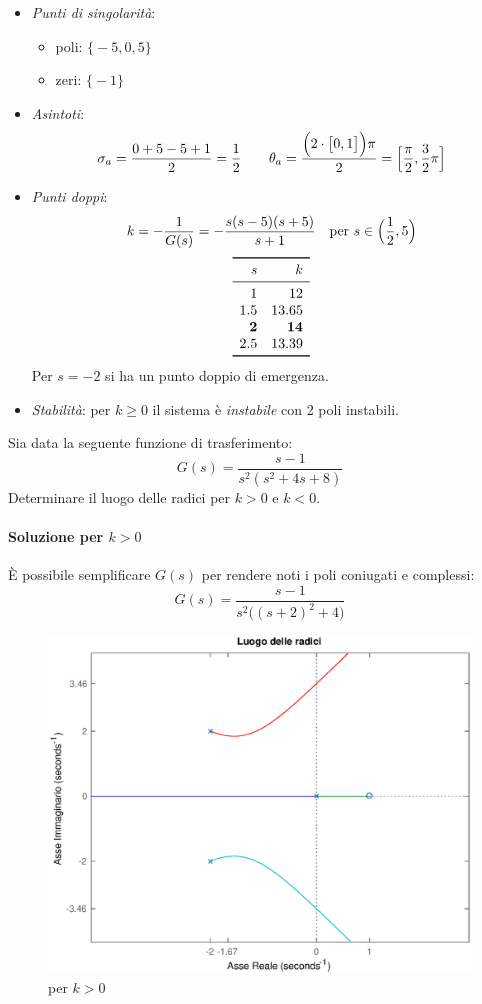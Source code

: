 \begin{itemize}
	\item \emph{Punti di singolarità}:
		\begin{itemize}
			\item poli: \(\bigl\{ -5,0,5 \bigr\}\)
			\item zeri: \(\bigl\{ -1 \bigr\}\)
		\end{itemize}
	\item \emph{Asintoti}:
		\[
			\sigma_a = \frac{0+5-5+1}{2} = \frac{1}{2} \qquad
			\theta_a = \frac{\Bigl(2\cdot \bigl[0,1\bigr]\Bigr)\pi}{2} = \Bigl[ \frac{\pi}{2},\frac{3}{2}\pi \Bigr]
		\]
	\item \emph{Punti doppi}:
		\[
			k = -\frac{1}{G(s)} = -\frac{s(s-5)(s+5)}{s+1} \quad
			\text{per } s \in \Bigl( \frac{1}{2},5 \Bigr)
		\]
		\[\begin{array}{rr}
			\toprule
			s 	&       k \\
			\midrule
			1 	&      12 \\
			1.5 	&   13.65 \\
			\bm{2} 	& \bm{14} \\
			2.5 	&   13.39 \\
			\bottomrule
		\end{array}\]
		Per \(s=-2\) si ha un punto doppio di emergenza.
	\item \emph{Stabilità}: per \(k \geq 0\) il sistema è \emph{instabile}
		con 2 poli instabili.
\end{itemize}


\exercise{}
Sia data la seguente funzione di trasferimento:
\[
	G(s) = \frac{s-1}{s^2(s^2+4s+8)}
\]
Determinare il luogo delle radici per \(k>0\) e \(k<0\).

\paragraph{Soluzione per \(k>0\)}
È possibile semplificare \(G(s)\) per rendere noti i poli coniugati e complessi:
\[
	G(s) = \frac{s-1}{s^2\bigl( (s+2)^2 +4 \bigr)}
\]

\begin{figure}[ht]
	\centering
	\includegraphics[scale=.5]{mod1/assets/rl_ex311}
	\caption{per \(k>0\)}
\end{figure}

